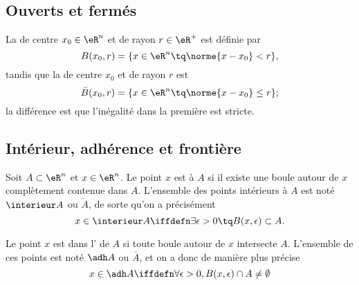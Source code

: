 					\subsection{Ouverts et fermés}

\begin{definition}
	La  de centre $x_0 \in \eR^n$ et de rayon $r \in
	\eR^+$ est définie par
	\begin{equation}
		B(x_0,r) = \{ x \in \eR^n \tq \norme{x - x_0} < r \},
	\end{equation}
	tandis que la  de centre $x_0$ et de rayon $r$ est
	\begin{equation}
		\bar B(x_0,r) = \{ x \in \eR^n \tq \norme{x - x_0} \leq r \};
	\end{equation}
	la différence est que l'inégalité dans la première est stricte.
\end{definition}

					\subsection{Intérieur, adhérence et frontière}

\begin{definition}
  Soit $A \subset \eR^n$ et $x \in \eR^n$. Le point $x$ est  à $A$ si il existe une boule autour de $x$ complètement contenue dans $A$. L'ensemble des points intérieurs à $A$ est noté $\interieur A$ ou $\mathring A$, de sorte qu'on a précisément
  \begin{equation*}
    x \in \interieur A \iffdefn  \exists \epsilon > 0 \tq
    B(x,\epsilon) \subset A.
  \end{equation*}
\end{definition}


\begin{definition}
Le point $x$ est dans l' de $A$ si toute boule autour de $x$ intersecte $A$. L'ensemble de ces points est noté $\adh A$ ou $\bar A$, et on a donc de manière plus précise
\begin{equation}
	x \in \adh A \iffdefn \forall \epsilon > 0, B(x,\epsilon) \cap A \neq \emptyset
\end{equation}
\end{definition}


